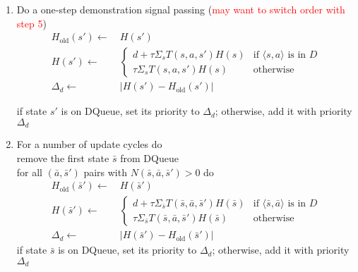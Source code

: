 \documentclass{article}
\begin{document}
\begin{enumerate}
\item Do a one-step demonstration signal passing (\textcolor{red}{may want to switch order with step 5})\\
\[
\begin{split}
H_{\text{old}}(s') \leftarrow\ & H(s')\\
H(s') \leftarrow\ & \begin{cases}
    d + \tau \Sigma_s T(s,a,s') H(s)& \text{if \(\langle s,a \rangle\) is in $D$}\\
    \tau \Sigma_s T(s,a,s') H(s)& \text{otherwise}
  \end{cases}\\
  \Delta_d \leftarrow\ & |H(s')-H_{\text{old}}(s')|
  \end{split}
\]

if state $s'$ is on DQueue, set its priority to $\Delta_d$; otherwise, add it with priority $\Delta_d$
\item For a number of update cycles do\\
remove the first state $\bar{s}$ from DQueue\\
for all $(\bar{a},\bar{s}')$ pairs with $N(\bar{s},\bar{a},\bar{s}')>0$ do
\[
\begin{split}
H_{\text{old}}(\bar{s}') \leftarrow\ & H(\bar{s}')\\
H(\bar{s}') \leftarrow\ & \begin{cases}
    d + \tau \Sigma_{\bar{s}} T(\bar{s},\bar{a},\bar{s}') H(\bar{s})& \text{if \(\langle \bar{s},\bar{a} \rangle\) is in $D$}\\
    \tau \Sigma_{\bar{s}} T(\bar{s},\bar{a},\bar{s}') H(\bar{s})& \text{otherwise}
  \end{cases}\\
  \Delta_d \leftarrow\ & |H(\bar{s}')-H_{\text{old}}(\bar{s}')|
  \end{split}
\] 
if state $\bar{s}$ is on DQueue, set its priority to $\Delta_d$; otherwise, add it with priority $\Delta_d$




	
\end{enumerate}
\end{document}
